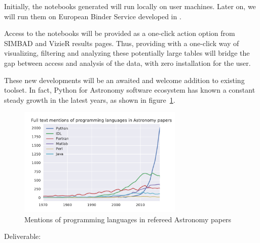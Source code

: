 \begin{task}[
  title=Astronomy application,
  id=astro,
  lead=CDS,
  PM=18,
  wphases={0-48},
  partners={CDS}
]
  Initially, the notebooks generated will run locally on user machines.
  Later on, we will run them on European Binder Service developed in .

  Access to the notebooks will be provided as a one-click action option from
  SIMBAD and VizieR results pages.
  Thus, providing with a one-click way of visualizing, filtering and analyzing
these potentially large tables will bridge the gap between access and analysis
of the data, with zero installation for the user.

  These new developments will be an awaited and welcome addition to existing 
  toolset. In fact, Python for Astronomy software ecosystem has known a constant
    steady growth in the latest years, as shown in figure~\ref{fig:python-astro-citations}.

  \begin{figure}[ht]\centering
  \includegraphics[width=0.7\textwidth]{python-astro-citations}
  \caption{Mentions of programming languages in refereed Astronomy papers}\label{fig:python-astro-citations}
\end{figure}

  Deliverable: 

\end{task}
